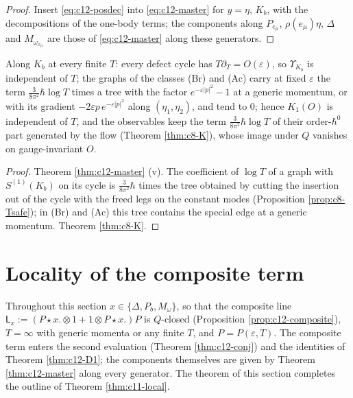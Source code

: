 \begin{proof}
Insert \eqref{eq:c12-posdec} into \eqref{eq:c12-master} for $y=\eta$, $K_b$, with the decompositions of the one-body terms; the components along $P_{e_\mu}$, $\rho(e_\mu)\eta$, $\Delta$ and $M_{\omega_{x_O}}$ are those of \eqref{eq:c12-master} along these generators.
\end{proof}

\begin{proposition}
\label{prop:c12-KT}
Along $K_b$ at every finite $T$: every defect cycle has $T\partial_T=O(\varepsilon)$, so $\Upsilon_{K_b}$ is independent of $T$; the graphs of the classes (Br) and (Ac) carry at fixed $\varepsilon$ the term $\tfrac3{8\pi^2}\hbar\log T$ times a tree with the factor $e^{-\varepsilon|p|^2}-1$ at a generic momentum, or with its gradient $-2\varepsilon p\,e^{-\varepsilon|p|^2}$ along $(\eta_1,\eta_2)$, and tend to $0$; hence $K_1(O)$ is independent of $T$, and the observables keep the term $\tfrac3{8\pi^2}\hbar\log T$ of their order-$\hbar^0$ part generated by the flow (Theorem \ref{thm:c8-K}), whose image under $Q$ vanishes on gauge-invariant $O$.
\end{proposition}

\begin{proof}
Theorem \ref{thm:c12-master} (v). The coefficient of $\log T$ of a graph with $S^{(1)}(K_b)$ on its cycle is $\tfrac3{8\pi^2}\hbar$ times the tree obtained by cutting the insertion out of the cycle with the freed legs on the constant modes (Proposition \ref{prop:c8-Tsafe}); in (Br) and (Ac) this tree contains the special edge at a generic momentum. Theorem \ref{thm:c8-K}.
\end{proof}

\section{Locality of the composite term}

Throughout this section $x\in\{\Delta,P_b,M_\omega\}$, so that the composite line $\mathsf L_x:=(P\star x.\otimes1+1\otimes P\star x.)P$ is $Q$-closed (Proposition \ref{prop:c12-composite}), $T=\infty$ with generic momenta or any finite $T$, and $P=P(\varepsilon,T)$. The composite term enters the second evaluation (Theorem \ref{thm:c12-conj}) and the identities of Theorem \ref{thm:c12-D1}; the components themselves are given by Theorem \ref{thm:c12-master} along every generator. The theorem of this section completes the outline of Theorem \ref{thm:c11-local}.

